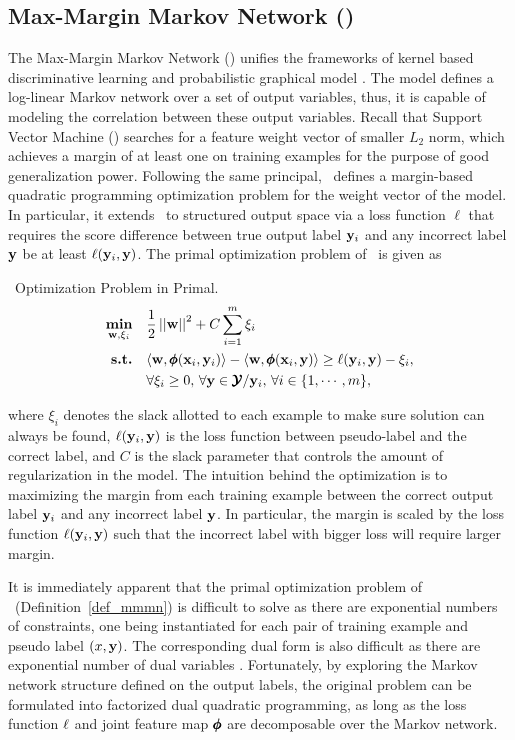 { 


%
\subsection{Max-Margin Markov Network (\mmmn)}

The Max-Margin Markov Network (\mmmn) unifies the frameworks of kernel based discriminative learning and probabilistic graphical model \citep{Taskar04max}.
The model defines a log-linear Markov network over a set of output variables, thus, it is capable of modeling the correlation between these output variables.
Recall that Support Vector Machine (\svm) searches for a feature weight vector of smaller $L_2$ norm, which achieves a margin of at least one on training examples for the purpose of good generalization power.
Following the same principal, \mmmn\ defines a margin-based quadratic programming optimization problem for the weight vector of the model.
In particular, it extends \svm\ to structured output space via a loss function $\ell$ that requires the score difference between true output label $\mathbf {y}_i$ and any incorrect label ${\mathbf {y}}$ be at least $\mathbf {\ell}(\mathbf {y}_i,{\mathbf {y}})$.
The primal optimization problem of \mmmn\ is given as
\begin{definition}{\mmmn\ Optimization Problem in Primal.}\label{def_mmmn}
	\begin{align*}
		\underset{\mathbf {w},\mathbf{\xi}_i}{\textbf{min}} & \quad\frac{1}{2}\left|\left| \mathbf {w} \right|\right|^2 + C\sum_{i=1}^{m}\xi_i \\
		\textbf{s.t.} & \quad\langle \mathbf {w}, \pmb \phi(\mathbf {x}_i,\mathbf {y}_i) \rangle - \langle \mathbf {w}, \pmb \phi(\mathbf {x}_i,\mathbf {y}) \rangle \ge \mathbf {\ell}(\mathbf {y}_i,\mathbf {y})-\xi_i,\\
		& \quad \forall \xi_i\ge0,\, \forall \mathbf {y}\in\pmb {\mathcal{Y}}/\mathbf {y}_i,\, \forall i\in\{1,\cdots,m\},
	\end{align*}
\end{definition}
where $\xi_i$ denotes the slack allotted to each example to make sure solution can always be found, $\mathbf {\ell}(\mathbf {y}_i,\mathbf {y})$ is the loss function between pseudo-label and the correct label, and $C$ is the slack parameter that controls the amount of regularization in the model.
The intuition behind the optimization is to maximizing the margin from each training example between the correct output label $\mathbf {y}_i$ and any incorrect label ${\mathbf {y}}$.
In particular, the margin is scaled by the loss function $\mathbf {\ell}(\mathbf {y}_i,{\mathbf {y}})$ such that the incorrect label with bigger loss will require larger margin. 

It is immediately apparent that the primal optimization problem of \mmmn\ (Definition~\ref{def_mmmn}) is difficult to solve as there are exponential numbers of constraints, one being instantiated for each pair of training example and pseudo label $(x,\mathbf {y})$.
The corresponding dual form is also difficult as there are exponential number of dual variables \cite[p.~4]{Taskar04max}.
Fortunately, by exploring the Markov network structure defined on the output labels, the original problem can be formulated into factorized dual quadratic programming, as long as the loss function $\mathbf {\ell}$ and joint feature map $\pmb \phi$ are decomposable over the Markov network.

}
